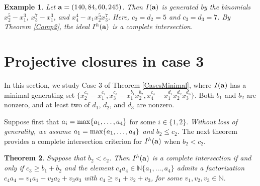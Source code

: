 \documentclass[10pt]{amsart}
\newtheorem{thm1}{Theorem}[section]
\newtheorem{ex1}[thm1]{Example}
\begin{document}
\begin{ex1} {\rm Let ${\bf a}=(140, 84, 60, 245)$. Then $I({\bf a})$ is generated by the binomials $x_{2}^{5}-x_{1}^{3}$, $x_{3}^{7}-x_{1}^3$, and $x_{4}^4-x_1x_2^5x_3^7$. Here, $c_{2}=d_{2}=5$ and $c_{3}=d_{3}=7$. By Theorem \ref{Comp2}, the ideal $I^{h}({\bf a})$ is a complete intersection.}
\end{ex1}



\section{Projective closures in case 3}

In this section, we study Case 3 of Theorem \ref{CasesMinimal}, where $I({\bf a})$ has a minimal generating set $\{x_{2}^{c_2}-x_{1}^{c_1}, x_{3}^{c_3}-x_{1}^{b_1}x_{2}^{b_2}, x_{4}^{c_4}-x_{1}^{d_1}x_{2}^{d_2}x_{3}^{d_3}\}$. Both $b_1$ and $b_2$ are nonzero, and at least two of $d_1$, $d_2$, and $d_3$ are nonzero.

Suppose first that $a_{i}={\rm max}\{a_1,\ldots,a_4\}$ for some $i \in \{1,2\}$. {\em Without loss of generality, we assume $a_{1}={\rm max}\{a_1,\ldots,a_4\}$ and $b_2 \leq c_2$.} The next theorem provides a complete intersection criterion for $I^{h}({\bf a})$ when $b_2<c_2$.

\begin{thm1} \label{Basic5} Suppose that $b_2<c_2$. Then $I^{h}({\bf a})$ is a complete intersection if and only if $c_{3} \geq b_{1}+b_{2}$ and the element $c_{4}a_{4} \in \mathbb{N}\{a_1,\ldots,a_4\}$ admits a factorization $c_{4}a_{4}=v_{1}a_{1}+v_{2}a_{2}+v_{3}a_{3}$ with $c_{4} \geq v_1+v_{2}+v_{3}$, for some $v_1, v_2, v_3 \in \mathbb{N}$. 
\end{thm1}
\end{document}
